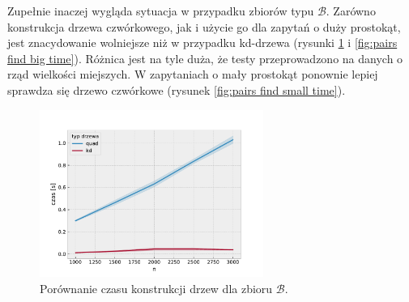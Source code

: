 \documentclass[12pt]{scrartcl}
\newcommand{\sB}{\mathcal B}
\begin{document}
Zupełnie inaczej wygląda sytuacja w przypadku zbiorów typu $\sB$. Zarówno konstrukcja drzewa czwórkowego, jak i użycie go dla zapytań o duży prostokąt, jest znacydowanie wolniejsze niż w przypadku kd-drzewa (rysunki \ref{fig:pairs construction time} i \ref{fig:pairs find big time}). Różnica jest na tyle duża, że testy przeprowadzono na danych o rząd wielkości miejszych. W zapytaniach o mały prostokąt ponownie lepiej sprawdza się drzewo czwórkowe (rysunek \ref{fig:pairs find small time}).

\begin{figure}[H]
    \centering
    \includegraphics[width=0.65\textwidth]{imgs/pairs_construction_time}
    \caption{Porównanie czasu konstrukcji drzew dla zbioru $\sB$.}
    \label{fig:pairs construction time}
\end{figure}
\end{document}
